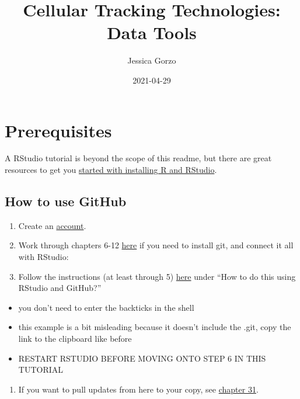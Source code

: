 \documentclass[
]{book}
\title{Cellular Tracking Technologies: Data Tools}
\author{Jessica Gorzo}
\date{2021-04-29}
\providecommand{\tightlist}{%
  \setlength{\itemsep}{0pt}\setlength{\parskip}{0pt}}
\begin{document}
\maketitle

{
\setcounter{tocdepth}{1}
\tableofcontents
}
\hypertarget{prerequisites}{%
\chapter*{Prerequisites}\label{prerequisites}}

A RStudio tutorial is beyond the scope of this readme, but there are great resources to get you \href{https://www.earthdatascience.org/courses/earth-analytics/document-your-science/setup-r-rstudio/}{started with installing R and RStudio}.

\hypertarget{how-to-use-github}{%
\section*{How to use GitHub}\label{how-to-use-github}}

\begin{enumerate}
\def\labelenumi{\arabic{enumi}.}
\tightlist
\item
  Create an \href{https://github.com}{account}.
\item
  Work through chapters 6-12 \href{https://happygitwithr.com/install-git.html}{here} if you need to install git, and connect it all with RStudio:
\item
  Follow the instructions (at least through 5) \href{https://r-bio.github.io/intro-git-rstudio/}{here} under ``How to do this using RStudio and GitHub?''
\end{enumerate}

\begin{itemize}
\tightlist
\item
  you don't need to enter the backticks in the shell
\item
  this example is a bit misleading because it doesn't include the .git, copy the link to the clipboard like before
\item
  RESTART RSTUDIO BEFORE MOVING ONTO STEP 6 IN THIS TUTORIAL
\end{itemize}

\begin{enumerate}
\def\labelenumi{\arabic{enumi}.}
\setcounter{enumi}{3}
\tightlist
\item
  If you want to pull updates from here to your copy, see \href{https://happygitwithr.com/upstream-changes.html\#pull-changes-from-upstream}{chapter 31}.
\end{enumerate}
\end{document}
